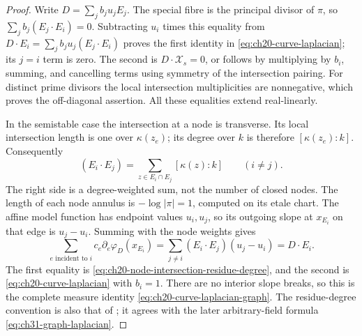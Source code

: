 \begin{proof}
Write \(D=\sum_j b_j u_jE_j\).  The special fibre is the principal
divisor of \(\pi\), so \(\sum_j b_j(E_j\cdot E_i)=0\).
Subtracting \(u_i\) times this equality from
\(D\cdot E_i=\sum_j b_j u_j(E_j\cdot E_i)\) proves the first
identity in \eqref{eq:ch20-curve-laplacian}; its \(j=i\) term is zero.
The second is \(D\cdot\mathcal X_s=0\), or follows by multiplying
by \(b_i\), summing, and cancelling terms using symmetry of the
intersection pairing.  For distinct prime divisors the local
intersection multiplicities are nonnegative, which proves the
off-diagonal assertion.  All these equalities extend real-linearly.

In the semistable case the intersection at a node is transverse.
Its local intersection length is one over \(\kappa(z_e)\); its
degree over \(k\) is therefore \([\kappa(z_e):k]\).  Consequently
\begin{equation}
\label{eq:ch20-node-intersection-residue-degree}
             (E_i\cdot E_j)
        =\sum_{z\in E_i\cap E_j}[\kappa(z):k]
                   \qquad(i\ne j).
\end{equation}
The right side is a degree-weighted sum, not the number of closed nodes.
The length of each node annulus is
\(-\log|\pi|=1\), computed on its etale chart.  The affine model
function has endpoint values \(u_i,u_j\), so its outgoing slope
at \(x_{E_i}\) on that edge is \(u_j-u_i\).  Summing with the
node weights gives
\[
 \sum_{e\text{ incident to }i}c_e\partial_e\varphi_D(x_{E_i})
    =\sum_{j\ne i}(E_i\cdot E_j)(u_j-u_i)
    =D\cdot E_i.
\]
The first equality is \eqref{eq:ch20-node-intersection-residue-degree},
and the second is \eqref{eq:ch20-curve-laplacian} with \(b_i=1\).
There are no interior slope breaks, so this is the complete measure
identity \eqref{eq:ch20-curve-laplacian-graph}.
The residue-degree convention is also that of
\cite[Remark~1.2.4 and \S2.2.3]{Thu05}; it agrees with the later
arbitrary-field formula \eqref{eq:ch31-graph-laplacian}.
\end{proof}

